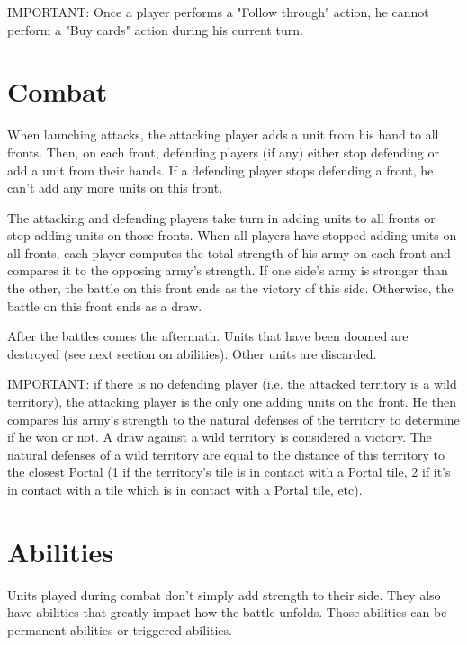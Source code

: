 \documentclass[a4paper]{article}
\begin{document}
    IMPORTANT: Once a player performs a "Follow through" action, he cannot perform a "Buy cards" action during his current turn.


\newpage
\section{Combat}

    When launching attacks, the attacking player adds a unit from his hand to all fronts.
    Then, on each front, defending players (if any) either stop defending or add a unit from their hands.
    If a defending player stops defending a front, he can't add any more units on this front.
    
    The attacking and defending players take turn in adding units to all fronts or stop adding units on those fronts.
    When all players have stopped adding units on all fronts, each player computes the total strength of his army on
    each front and compares it to the opposing army's strength.
    If one side's army is stronger than the other, the battle on this front ends as the victory of this side.
    Otherwise, the battle on this front ends as a draw.
    
    After the battles comes the aftermath.
    Units that have been doomed are destroyed (see next section on abilities).
    Other units are discarded.
    
    IMPORTANT: if there is no defending player (i.e. the attacked territory is a wild territory),
        the attacking player is the only one adding units on the front.
        He then compares his army's strength to the natural defenses of the territory to determine if he won or not.
        A draw against a wild territory is considered a victory.
        The natural defenses of a wild territory are equal to the distance of this territory to the closest Portal
        (1 if the territory's tile is in contact with a Portal tile, 2 if it's in contact with a tile which is in contact with a Portal tile, etc).



\section{Abilities}

    Units played during combat don't simply add strength to their side.
    They also have abilities that greatly impact how the battle unfolds.
    Those abilities can be permanent abilities or triggered abilities.
\end{document}

